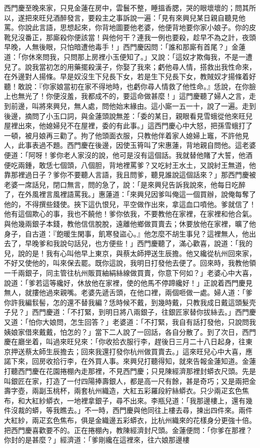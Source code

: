 西門慶至晚來家，只見金蓮在房中，雲鬟不整，睡搵香腮，哭的眼壞壞的；問其所以，遂把來旺兒酒醉發言，要殺主之事訴說一遍：「見有來興兒某日親自聽見他罵。你說此言語，思想起來，你背地圖要他老婆，他便背地要你家小娘子。你的皮靴兒沒番正，那廝殺你便該當！與他何干？連我一例也要殺，趁早不為之計，夜頭早晚，人無後眼，只怕暗遭他毒手！」西門慶因問：「誰和那廝有首尾？」金蓮道：「你休來問我，只問那上房裡小玉便知了。」又說：「這奴才欺侮我，不是一遭兒了。說我當初怎的用藥擺殺漢子，你娶了我來；虧他尋人情，搭救出我性命來，在外邊對人揚條。早是奴沒生下兒長下女，若是生下兒長下女，教賊奴才揚條着好聽！敢說：『你家娘當初在家不得地時，也虧你尋人情救了他性命。』恁說，在你臉上也無光了！你便沒羞，我都成不的，要這命做甚麼！」這門慶聽了婦人之言，走到前邊，叫將來興兒，無人處，問他始末緣由。這小廝一五一十，說了一遍。走到後邊，摘問了小玉口詞，與金蓮頭說無差：「委的某日，親眼看見雪蛾從他來旺兒屋裡出來，他媳婦兒不在屋裡，委的有此事。」這西門慶心中大怒，把孫雪蛾打了一頓，被月娘再三勸了。拘了他頭面衣服，只教他伴着家人媳婦上竈，不許他見人，此事表過不題。西門慶在後邊，因使玉筲叫了宋惠蓮，背地親自問他。這老婆便道：「阿呀！爹你老人家沒的說，他可是沒有這個話。我就替他賭了大誓，他酒便吃兩鍾，敢恁七個頭，八個胆，背地裡罵爹？又吃紂王水土，又說紂王無道，他靠那裡過日子？爹你不要聽人言語，我且問爹，聽見誰說這個話來？」那西門慶被老婆一席話兒，閉口無言，問的急了，說：「是來興兒告訴我說來，他每日吃醉了，在外風裡言風裡語罵我。」惠蓮道：「來興兒因爹叫俺這一個買辦，說俺每奪了他的，不得撰些錢使。挾下這仇恨兒，平空做作出來，拿這血口噴他。爹就信了！他有這個欺心的事，我也不饒他！爹你依我，不要教他在家裡，在家裡和他合氣。與他幾兩銀子本錢，教他信信脫脫，遠離他鄉做買賣去；休要放他在家裡，曠了他身子，自古道：『飽暖生閑事，飢寒發盜心。』他怎麼不胡生事兒？這裡無人，他出去了，早晚爹和我說句話兒，也方便些！」西門慶聽了，滿心歡喜，說道：「我的兒，說的是！我有心叫他早上東京，與蔡太師押送生辰擔。他又纔從杭州回來家，不好又使他的，叫來保去罷。既你這說，我明日打發他去便了。回來時，我教他領一千兩銀子，同主管往杭州販買紬絹絲線做買賣，你意下何如？」老婆心中大喜，說道：「爹若這等纔好，休放他在家裡，使的他馬不停蹄纔好！」正說着西門慶見無人，就摟他過來親嘴。老婆先遞舌頭，在他口裡，兩個咂做一處。婦人道：「爹你許我編䯼髻，怎的還不替我編？恁時候不戴，到幾時戴，只教我成日戴這頭髮壳子兒？」西門慶道：「不打緊，到明日將八兩銀子，往銀匠家替你拔絲去。」西門慶又道：「怕你大娘問，怎生回答？」老婆道：「不打緊，我自有話打發他，只說問我姨娘家借來戴戴，怕怎的？」當下二人說了一回話，各自分散了。到了次日，西門慶在廳坐着，叫過來旺兒來：「你收拾衣服行李，趕後日三月二十八日起身，往東京押送蔡太師生辰擔去；回來我還打發你杭州做買賣去。」這來旺兒心中大喜，應諾下來，回房收拾行李，在外買人事。來興兒打聽得知，就來告報金蓮知道。金蓮打聽西門慶在花園捲棚內走那裡，不見西門慶；只見陳經濟那裡封蟒衣尺頭。先是叫銀匠在家，打造了一付四陽捧壽銀人，都是高一尺有餘，甚是奇巧；又是兩把金壽字壺，兩副玉桃杯，兩套杭州織造，大紅五彩羅段紵絲蟒衣。只少兩疋玄色焦布，和大紅紗蟒衣，一地裡拿銀子，尋不出來。李瓶兒道：「我那邊樓上，還有幾件沒裁的蟒，等我瞧去。」不一時，西門慶與他同往上樓去尋，揀出四件來。兩件大紅紗，兩疋玄色焦布，俱是金織邊五彩蟒衣，比杭州織來的花樣身分更強十倍。把西門慶喜歡要不的。正在捲棚內，教陳經濟封尺頭。金蓮便問：「你爹在那裡？你封的是甚麼？」經濟道：「爹剛纔在這裡來，往六娘那邊樓